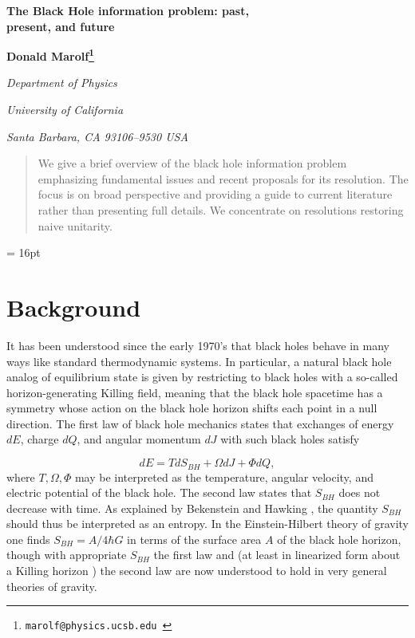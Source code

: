 \documentclass[12pt]{article}
\begin{document}



\begin{titlepage}
\bigskip
\bigskip\bigskip\bigskip
\begin{center}
\large\bf The Black Hole information problem: past, \\ present, and future
\end{center}

\bigskip\bigskip\bigskip
\bigskip\bigskip\bigskip


 \centerline
 {\bf Donald Marolf\footnote{\tt marolf@physics.ucsb.edu }}
 \medskip


\centerline{\em Department of Physics}
\centerline{\em University of California}
\centerline{\em Santa Barbara, CA 93106--9530 USA}

\bigskip\bigskip\bigskip

\bigskip\bigskip\bigskip


\begin{abstract}
We give a brief overview of the black hole information problem emphasizing fundamental issues and recent proposals for its resolution.  The focus is on broad perspective and providing a guide to current literature rather than presenting full details.  We concentrate on resolutions restoring naive unitarity.
\end{abstract}
\end{titlepage}

\baselineskip = 16pt


\section{Background}

It has been understood since the early 1970's that black holes behave in many ways like standard thermodynamic systems.  In particular, a natural black hole analog of equilibrium state is given by restricting to black holes with a so-called horizon-generating Killing field, meaning that the black hole spacetime has a symmetry whose action on the black hole horizon shifts each point in a null direction.  The first law of black hole mechanics states that exchanges of energy $dE$, charge $dQ$, and angular momentum $dJ$ with such black holes satisfy

\begin{equation}
\label{FirstLaw}
dE = T dS_{BH} + \Omega dJ + \Phi dQ,
\end{equation}
where $T, \Omega, \Phi$ may be interpreted as the temperature, angular velocity, and electric potential of the black hole.   The second law states that $S_{BH}$ does not decrease with time.  As explained by Bekenstein \cite{Bekenstein:1973ur} and Hawking \cite{Hawking:1974sw}, the quantity $S_{BH}$ should thus be interpreted as an entropy.   In the Einstein-Hilbert theory of gravity one finds $S_{BH} = A/4\hbar G$ in terms of the surface area $A$ of the black hole horizon, though with appropriate $S_{BH}$ the first law \cite{Wald:1993nt} and (at least in linearized form about a Killing horizon \cite{Wall:2015raa}) the second law are now understood to hold  in very general theories of gravity.
\end{document}
